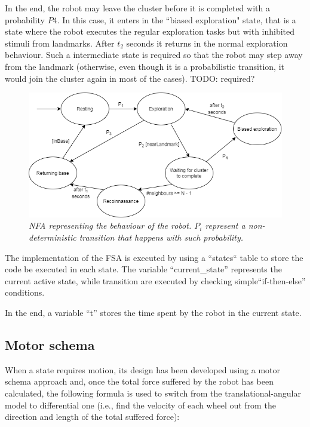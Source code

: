 \noindent
In the end, the robot may leave the cluster before it is completed with a probability $P4$. In this case, it enters in the ``biased exploration" state, that is a state where the robot executes the regular exploration tasks
but with inhibited stimuli from landmarks. After $t_2$ seconds it returns in the normal exploration behaviour. Such a intermediate state is required so that the robot may step away from the landmark (otherwise, even though it is a probabilistic transition, it would join the cluster again in most of the cases). TODO: required?  

\begin{figure}[H]
\centering
\includegraphics[width=\linewidth]{images/NFA.png}
\caption{\textit{NFA representing the behaviour of the robot. $P_i$ represent a non-deterministic transition that happens with such probability.}}
\label{fig:NFA}
\end{figure}

The implementation of the FSA is executed by using a ``states`` table to store the code be executed in each state. The variable ``current\_state'' represents the current active state, while transition are executed by checking simple``if-then-else'' conditions.

\noindent
In the end, a variable ``t'' stores the time spent by the robot in the current state.

\subsection{Motor schema}

When a state requires motion, its design has been developed using a motor schema approach and, once the total force suffered by the robot has been calculated, the following formula is used to switch from the translational-angular model to differential one (i.e., find the velocity of each wheel out from the direction and length of the total suffered force):    

